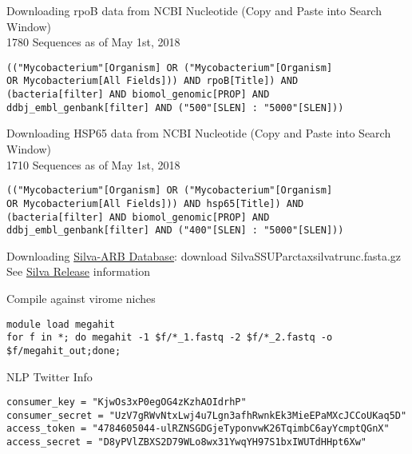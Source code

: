 \documentclass[idxtotoc,hyperref,openany,oneside]{labbook} %
\begin{document}

Downloading rpoB data from NCBI Nucleotide (Copy and Paste into Search Window) \\

1780 Sequences as of May 1st, 2018

\begin{verbatim}
(("Mycobacterium"[Organism] OR ("Mycobacterium"[Organism]
OR Mycobacterium[All Fields])) AND rpoB[Title]) AND
(bacteria[filter] AND biomol_genomic[PROP] AND
ddbj_embl_genbank[filter] AND ("500"[SLEN] : "5000"[SLEN]))
\end{verbatim}


Downloading HSP65 data from NCBI Nucleotide (Copy and Paste into Search Window) \\

1710 Sequences as of May 1st, 2018

\begin{verbatim}
(("Mycobacterium"[Organism] OR ("Mycobacterium"[Organism]
OR Mycobacterium[All Fields])) AND hsp65[Title]) AND
(bacteria[filter] AND biomol_genomic[PROP] AND
ddbj_embl_genbank[filter] AND ("400"[SLEN] : "5000"[SLEN]))
\end{verbatim}



Downloading \href{https://www.arb-silva.de/no_cache/download/archive/release_132/Exports/}{Silva-ARB Database}: download SilvaSSUParctaxsilvatrunc.fasta.gz \\

See \href{https://www.arb-silva.de/documentation/release-132/}{Silva Release} information




Compile against virome niches

\begin{verbatim}
module load megahit 
for f in *; do megahit -1 $f/*_1.fastq -2 $f/*_2.fastq -o $f/megahit_out;done;
\end{verbatim}




NLP Twitter Info
\\
\begin{verbatim}
consumer_key = "KjwOs3xP0egOG4zKzhAOIdrhP" 
consumer_secret = "UzV7gRWvNtxLwj4u7Lgn3afhRwnkEk3MieEPaMXcJCCoUKaq5D"
access_token = "4784605044-ulRZNSGDGjeTyponvwK26TqimbC6ayYcmptQGnX"
access_secret = "D8yPVlZBXS2D79WLo8wx31YwqYH97S1bxIWUTdHHpt6Xw"
\end{verbatim}
\end{document}
